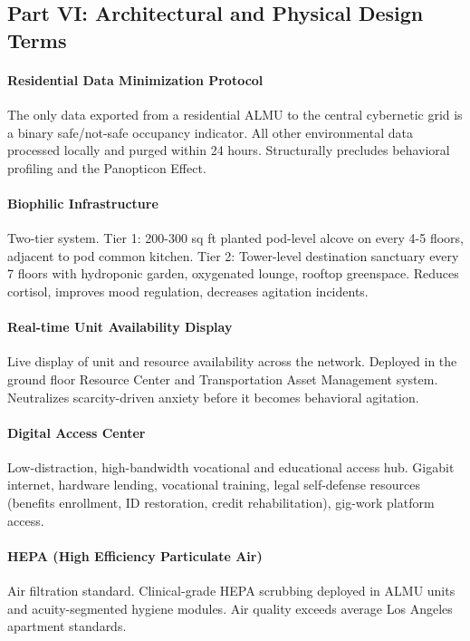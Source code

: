 {\subsection*{Part VI: Architectural and Physical Design Terms}

\paragraph{Residential Data Minimization Protocol} The only data exported from a residential ALMU to the central cybernetic grid is a binary safe/not-safe occupancy indicator. All other environmental data processed locally and purged within 24 hours. Structurally precludes behavioral profiling and the Panopticon Effect.

\paragraph{Biophilic Infrastructure} Two-tier system. Tier 1: 200-300 sq ft planted pod-level alcove on every 4-5 floors, adjacent to pod common kitchen. Tier 2: Tower-level destination sanctuary every 7 floors with hydroponic garden, oxygenated lounge, rooftop greenspace. Reduces cortisol, improves mood regulation, decreases agitation incidents.

\paragraph{Real-time Unit Availability Display} Live display of unit and resource availability across the network. Deployed in the ground floor Resource Center and Transportation Asset Management system. Neutralizes scarcity-driven anxiety before it becomes behavioral agitation.

\paragraph{Digital Access Center} Low-distraction, high-bandwidth vocational and educational access hub. Gigabit internet, hardware lending, vocational training, legal self-defense resources (benefits enrollment, ID restoration, credit rehabilitation), gig-work platform access.

\paragraph{HEPA (High Efficiency Particulate Air)} Air filtration standard. Clinical-grade HEPA scrubbing deployed in ALMU units and acuity-segmented hygiene modules. Air quality exceeds average Los Angeles apartment standards.

}
